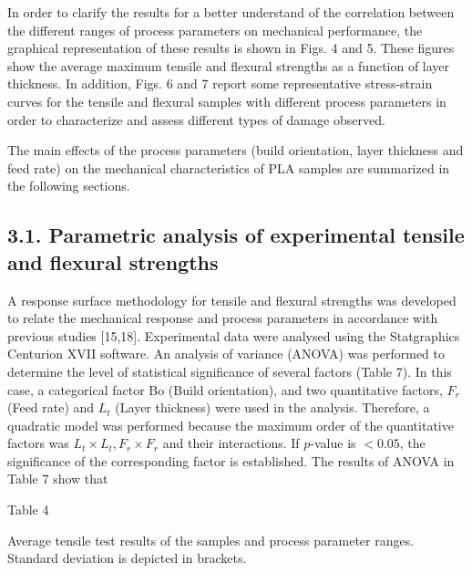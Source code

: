 \documentclass[10pt]{article}
\begin{document}
In order to clarify the results for a better understand of the correlation between the different ranges of process parameters on mechanical performance, the graphical representation of these results is shown in Figs. 4 and 5. These figures show the average maximum tensile and flexural strengths as a function of layer thickness. In addition, Figs. 6 and 7 report some representative stress-strain curves for the tensile and flexural samples with different process parameters in order to characterize and assess different types of damage observed.

The main effects of the process parameters (build orientation, layer thickness and feed rate) on the mechanical characteristics of PLA samples are summarized in the following sections.

\subsection*{3.1. Parametric analysis of experimental tensile and flexural strengths}
A response surface methodology for tensile and flexural strengths was developed to relate the mechanical response and process parameters in accordance with previous studies [15,18]. Experimental data were analysed using the Statgraphics Centurion XVII software. An analysis of variance (ANOVA) was performed to determine the level of statistical significance of several factors (Table 7). In this case, a categorical factor Bo (Build orientation), and two quantitative factors, $F_{r}$ (Feed rate) and $L_{t}$ (Layer thickness) were used in the analysis. Therefore, a quadratic model was performed because the maximum order of the quantitative factors was $L_{t} \times L_{t}, F_{r} \times F_{r}$ and their interactions. If $p$-value is $<0.05$, the significance of the corresponding factor is established. The results of ANOVA in Table 7 show that

Table 4

Average tensile test results of the samples and process parameter ranges. Standard deviation is depicted in brackets.
\end{document}
